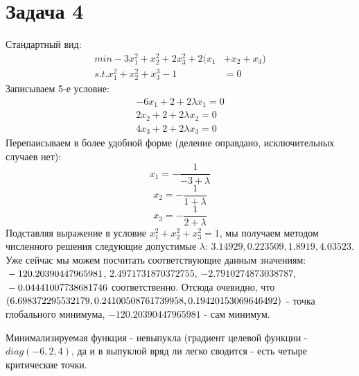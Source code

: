 \documentclass{article}
\begin{document}
\section{Задача 4}
Стандартный вид: 
\begin{align*}
 min -3x_1^2 + x_2^2 + 2x_3^2 + 2(x_1 &+ x_2 + x_3) \\
 s. t. x_1^2 + x_2^2 + x_3^3 - 1 &= 0
\end{align*}
Записываем 5-е условие:
\begin{align*}
-6x_1 + 2 + 2 \lambda x_1 = 0 \\
2x_2 + 2 + 2 \lambda x_2 = 0 \\
4x_3 + 2 +2\lambda x_3 = 0 
\end{align*}
Перепаисываем в более удобной форме (деление оправдано, исключительных случаев нет): $$x_1 = -\frac{1}{-3 + \lambda} $$
$$ x_2 = -\frac{1}{1 + \lambda} $$
$$ x_3 = -\frac{1}{2 + \lambda} $$
Подставляя выражение в условие $ x_1^2 + x_2^2 + x_3^2 = 1$, мы получаем методом численного решения следующие допустимые $\lambda$: $3.14929, 0.223509, 1.8919, 4.03523$. Уже сейчас мы можем посчитать соответствующие данным значениям:
$\\-120.20390447965981$, $2.4971731870372755$, $-2.7910274873038787$, $\\-0.04441007738681746$
соответственно. Отсюда очевидно, что $(6.698372295532179, \\ 0.24100508761739958, 0.19420153069646492)$ - точка глобального минимума, $-120.20390447965981$ - сам минимум.

Минимализируемая функция - невыпукла (градиент целевой функции - $diag(-6, 2, 4)$, да и в выпуклой вряд ли легко сводится - есть четыре критические точки.
\end{document}
